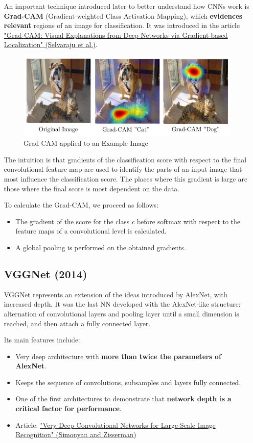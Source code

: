 An important technique introduced later to better understand how CNNs work is \textbf{Grad-CAM} (Gradient-weighted Class Activation Mapping), which \textbf{evidences relevant} regions of an image for classification.
It was introduced in the article \href{https://arxiv.org/pdf/1610.02391}{"Grad-CAM: Visual Explanations from Deep Networks via Gradient-based Localization" (Selvaraju et al.)}.

\begin{figure}[!htbp]
    \centering
    \includegraphics[width=0.7\linewidth]{tikz/chapter5 - GradCam.pdf}
    \caption{Grad-CAM applied to an Example Image}
\end{figure}

The intuition is that gradients of the classification score with respect to the final convolutional feature map are used to identify the parts of an input image that most influence the classification score. The places where this gradient is large are those where the final score is most dependent on the data.

To calculate the Grad-CAM, we proceed as follows:

\begin{itemize}
    \item The gradient of the score for the class \(c\) before softmax with respect to the feature maps of a convolutional level is calculated.
    \item A global pooling is performed on the obtained gradients.
\end{itemize}

\subsection{VGGNet (2014)}
VGGNet represents an extension of the ideas introduced by AlexNet, with increased depth. It was the last NN developed with the AlexNet-like structure: alternation of convolutional layers and pooling layer until a small dimension is reached, and then attach a fully connected layer.

Its main features include:
\begin{itemize}
    \item Very deep architecture with \textbf{more than twice the parameters of AlexNet}.
    \item Keeps the sequence of convolutions, subsamples and layers fully connected.
    \item One of the first architectures to demonstrate that \textbf{network depth is a critical factor for performance}.
    \item Article: \href{https://arxiv.org/pdf/1409.1556.pdf}{"Very Deep Convolutional Networks for Large-Scale Image Recognition" (Simonyan and Zisserman)}
\end{itemize}

